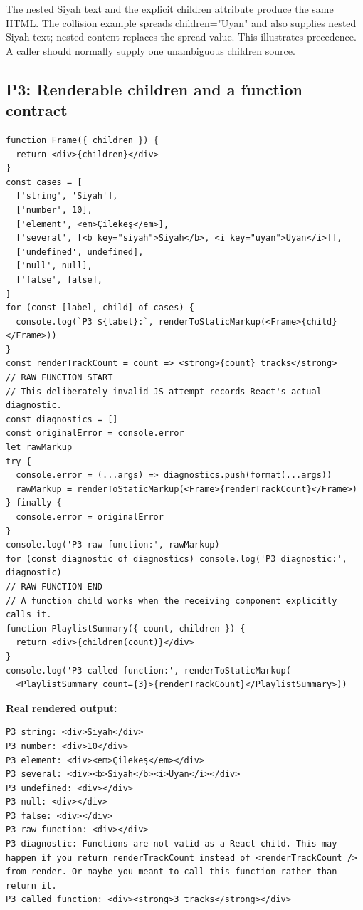 \documentclass[
  10pt,
  a4paper,
  titlepage]{article}
\begin{document}
The nested Siyah text and the explicit children attribute produce the
same HTML. The collision example spreads children="Uyan" and also
supplies nested Siyah text; nested content replaces the spread value.
This illustrates precedence. A caller should normally supply one
unambiguous children source.

\subsection{P3: Renderable children and a function
contract}\label{p3-renderable-children-and-a-function-contract}

\Needspace{82.4pt}
\begin{lstlisting}[language=JSX]
function Frame({ children }) {
  return <div>{children}</div>
}
const cases = [
  ['string', 'Siyah'],
  ['number', 10],
  ['element', <em>Çilekeş</em>],
  ['several', [<b key="siyah">Siyah</b>, <i key="uyan">Uyan</i>]],
  ['undefined', undefined],
  ['null', null],
  ['false', false],
]
for (const [label, child] of cases) {
  console.log(`P3 ${label}:`, renderToStaticMarkup(<Frame>{child}</Frame>))
}
const renderTrackCount = count => <strong>{count} tracks</strong>
// RAW FUNCTION START
// This deliberately invalid JS attempt records React's actual diagnostic.
const diagnostics = []
const originalError = console.error
let rawMarkup
try {
  console.error = (...args) => diagnostics.push(format(...args))
  rawMarkup = renderToStaticMarkup(<Frame>{renderTrackCount}</Frame>)
} finally {
  console.error = originalError
}
console.log('P3 raw function:', rawMarkup)
for (const diagnostic of diagnostics) console.log('P3 diagnostic:', diagnostic)
// RAW FUNCTION END
// A function child works when the receiving component explicitly calls it.
function PlaylistSummary({ count, children }) {
  return <div>{children(count)}</div>
}
console.log('P3 called function:', renderToStaticMarkup(
  <PlaylistSummary count={3}>{renderTrackCount}</PlaylistSummary>))
\end{lstlisting}


\textbf{Real rendered output:}

\Needspace{82.4pt}
\begin{lstlisting}
P3 string: <div>Siyah</div>
P3 number: <div>10</div>
P3 element: <div><em>Çilekeş</em></div>
P3 several: <div><b>Siyah</b><i>Uyan</i></div>
P3 undefined: <div></div>
P3 null: <div></div>
P3 false: <div></div>
P3 raw function: <div></div>
P3 diagnostic: Functions are not valid as a React child. This may happen if you return renderTrackCount instead of <renderTrackCount /> from render. Or maybe you meant to call this function rather than return it.
P3 called function: <div><strong>3 tracks</strong></div>
\end{lstlisting}
\end{document}
